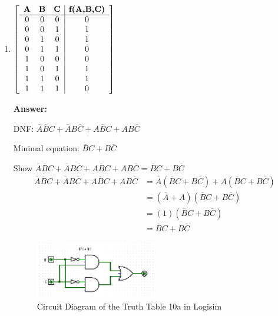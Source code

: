 \documentclass[12pt]{article}
\begin{document}
\begin{enumerate}
    \begin{enumerate}
      \item
      \noindent
      $\displaystyle
      \left[
        \begin{array}{c c c|c}
          \textbf{A} & \textbf{B} & \textbf{C} & \textbf{f(A,B,C)} \\
          \hline
          0 & 0 & 0 & 0 \\
          0 & 0 & 1 & 1 \\
          0 & 1 & 0 & 1 \\
          0 & 1 & 1 & 0 \\
          1 & 0 & 0 & 0 \\
          1 & 0 & 1 & 1 \\
          1 & 1 & 0 & 1 \\
          1 & 1 & 1 & 0
        \end{array}
      \right]$

      \vspace{2em}
      \textbf{Answer:}
      \begin{Karnaughvuit}
      \end{Karnaughvuit}

      DNF: $\overline{A}\overline{B}C + \overline{A}B\overline{C} + A\overline{B}C + AB\overline{C}$

      Minimal equation: $\overline{B}C + B\overline{C}$

      Show $\overline{A}\overline{B}C + \overline{A}B\overline{C} + A\overline{B}C + AB\overline{C} = \overline{B}C + B\overline{C}$
      \begin{align*}
        \overline{A}\overline{B}C + \overline{A}B\overline{C} + A\overline{B}C + AB\overline{C} &= \overline{A}(\overline{B}C + B\overline{C}) + A(\overline{B}C + B\overline{C}) \\
        &= (\overline{A}+A)(\overline{B}C + B\overline{C})\\
        &=(1)(\overline{B}C + B\overline{C})\\
        &=\overline{B}C + B\overline{C}
      \end{align*}

      \begin{figure}[h]
        \centering
        \includegraphics[width=0.5\textwidth]{assn/02/media/10a.png}
        \caption{Circuit Diagram of the Truth Table 10a in Logisim}
      \end{figure}


\end{enumerate}
\end{enumerate}
\end{document}
